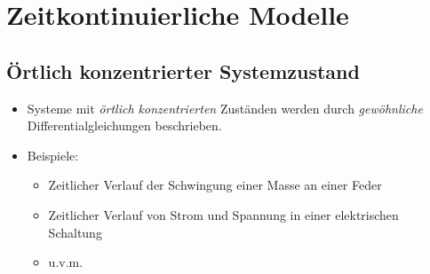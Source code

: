 \chapter{Zeitkontinuierliche Modelle} %
	\section{Örtlich konzentrierter Systemzustand} %
		\begin{itemize}
			\item Systeme mit \textit{örtlich konzentrierten} Zuständen werden durch \textit{gewöhnliche} Differentialgleichungen beschrieben.
			\item Beispiele:
				\begin{itemize}
					\item Zeitlicher Verlauf der Schwingung einer Masse an einer Feder
					\item Zeitlicher Verlauf von Strom und Spannung in einer elektrischen Schaltung
					\item u.v.m.
				\end{itemize}
		\end{itemize}

